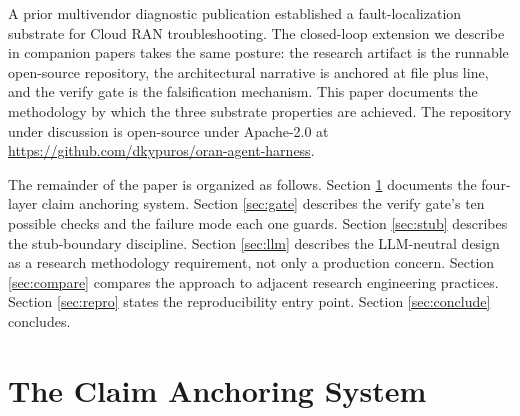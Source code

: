 \documentclass[twocolumn,10pt,a4paper]{article}
\begin{document}
A prior multivendor diagnostic publication \cite{multivendor_blog_2026} established a fault-localization substrate for Cloud RAN troubleshooting. The closed-loop extension we describe in companion papers takes the same posture: the research artifact is the runnable open-source repository, the architectural narrative is anchored at file plus line, and the verify gate is the falsification mechanism. This paper documents the methodology by which the three substrate properties are achieved. The repository under discussion is open-source under Apache-2.0 at \url{https://github.com/dkypuros/oran-agent-harness}.

The remainder of the paper is organized as follows. Section \ref{sec:anchoring} documents the four-layer claim anchoring system. Section \ref{sec:gate} describes the verify gate's ten possible checks and the failure mode each one guards. Section \ref{sec:stub} describes the stub-boundary discipline. Section \ref{sec:llm} describes the LLM-neutral design as a research methodology requirement, not only a production concern. Section \ref{sec:compare} compares the approach to adjacent research engineering practices. Section \ref{sec:repro} states the reproducibility entry point. Section \ref{sec:conclude} concludes.

\section{The Claim Anchoring System}
\label{sec:anchoring}
\end{document}
